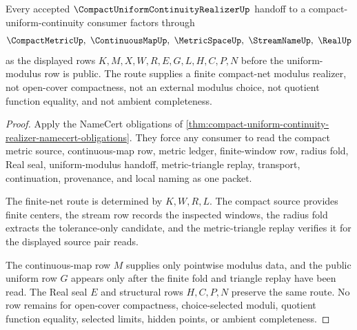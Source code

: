 \begin{theorem}
\label{thm:compact-uniform-continuity-realizer-finite-net-route}
Every accepted $\CompactUniformContinuityRealizerUp$ handoff to a compact-uniform-continuity consumer factors through
$$
\CompactMetricUp,\ \ContinuousMapUp,\ \MetricSpaceUp,\ \StreamNameUp,\ \RealUp
$$
as the displayed rows $K,M,X,W,R,E,G,L,H,C,P,N$ before the uniform-modulus row is public. The route supplies a finite compact-net modulus realizer, not open-cover compactness, not an external modulus choice, not quotient function equality, and not ambient completeness.
\end{theorem}
\begin{proof}
Apply the NameCert obligations of \autoref{thm:compact-uniform-continuity-realizer-namecert-obligations}. They force any consumer to read the compact metric source, continuous-map row, metric ledger, finite-window row, radius fold, Real seal, uniform-modulus handoff, metric-triangle replay, transport, continuation, provenance, and local naming as one packet.

The finite-net route is determined by $K,W,R,L$. The compact source provides finite centers, the stream row records the inspected windows, the radius fold extracts the tolerance-only candidate, and the metric-triangle replay verifies it for the displayed source pair reads.

The continuous-map row $M$ supplies only pointwise modulus data, and the public uniform row $G$ appears only after the finite fold and triangle replay have been read. The Real seal $E$ and structural rows $H,C,P,N$ preserve the same route. No row remains for open-cover compactness, choice-selected moduli, quotient function equality, selected limits, hidden points, or ambient completeness.
\end{proof}



